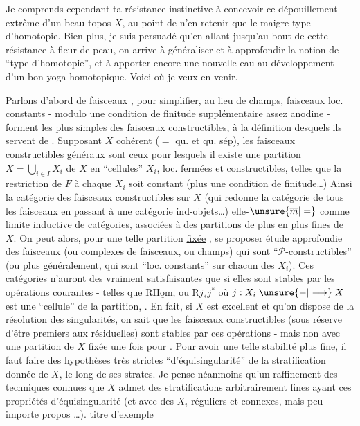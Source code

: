 Je comprends cependant ta résistance instinctive à concevoir ce dépouillement extrême d'un beau topos $X$, au point de n'en retenir que le maigre type d'homotopie. Bien plus, je suis persuadé qu'en
allant jusqu'au bout\unsure{,} de cette résistance à fleur de peau, on arrive à généraliser et à approfondir la notion de ``type d'homotopie'', et à apporter encore une nouvelle eau au développement d'un bon yoga homotopique. Voici où je veux en venir.

Parlons d'abord de faisceaux , pour simplifier, au lieu de champs,   faisceaux loc. constants - modulo une condition de finitude supplémentaire assez anodine - forment les plus simples des faisceaux \uline{constructibles}, à la définition desquels ils servent de . Supposant $X$ cohérent ($=$ qu.  et qu. sép), les faisceaux constructibles généraux sont ceux pour lesquels il existe une partition  $X=\bigcup\limits_{i\in I}X_i$ de $X$ en ``cellules''  $X_i$, loc. fermées et constructibles, telles que  la restriction de $F$ à chaque $X_i$ soit  constant  (plus une condition de finitude\ldots) Ainsi la catégorie des faisceaux constructibles sur $X$  (qui redonne la catégorie de tous les faisceaux en passant à une catégorie  ind-objets\ldots)  elle-$\unsure{\overline m|=}$ comme limite inductive de catégories, associées à des partitions de plus en
plus fines de $X$. On peut alors, pour une telle partition \uline{fixée} , se proposer  étude approfondie  des faisceaux (ou complexes de faisceaux, ou champs) qui sont ``$\mathcal P$-constructibles'' (ou plus généralement, qui sont ``loc. constants'' sur chacun des $X_i$). Ces catégories n'auront des   vraiment satisfaisantes que si elles sont stables par les opérations courantes - telles que $\mathrm R\underline{\mathrm{Hom}}$, ou $\mathrm Rj_*j^*$ où $j:X_i\mathrel{\unsure{-|\longrightarrow}}X$ est une ``cellule'' de la partition,  . En fait, si $X$ est excellent et qu'on dispose de la résolution des singularités, on sait que les faisceaux  constructibles  (sous réserve d'être premiers aux  résiduelles) sont stables par  ces opérations - mais non avec une partition de $X$ fixée une fois pour . Pour avoir une telle stabilité plus fine, il faut faire des hypothèses très strictes  ``d'équisingularité'' de la stratification donnée de $X$, le long de ses strates. Je pense néanmoins qu'un raffinement des techniques connues  que $X$ admet des stratifications arbitrairement fines ayant ces propriétés d'équisingularité (et avec des $X_i$ réguliers et connexes, mais peu importe   propos \ldots).  titre d'exemple
